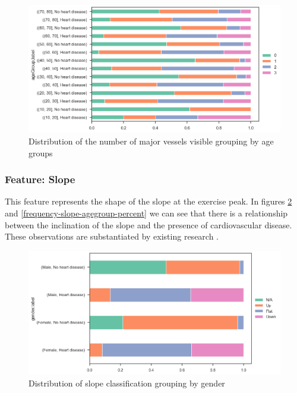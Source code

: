 \begin{figure}[H]
    \caption{Distribution of the number of major vessels visible grouping by age groups}\label{frequency-vessel-age-percent}
    \centering
    \includegraphics[width=\linewidth]{media/frequency-02-agegroup-vessels.png}
\end{figure}

\subsubsection{Feature: Slope}

This feature represents the shape of the slope at the exercise peak. In figures \ref{frequency-slope-gender-percent}
and \ref{frequency-slope-agegroup-percent} we can see that there is a relationship between the inclination of the slope
and the presence of cardiovascular disease. These observations are substantiated by existing research \cite{Fluoroscopy}.

\begin{figure}[H]
    \caption{Distribution of slope classification grouping by gender}\label{frequency-slope-gender-percent}
    \centering
    \includegraphics[width=\linewidth]{media/frequency-03-gender-slope.png}
\end{figure}

